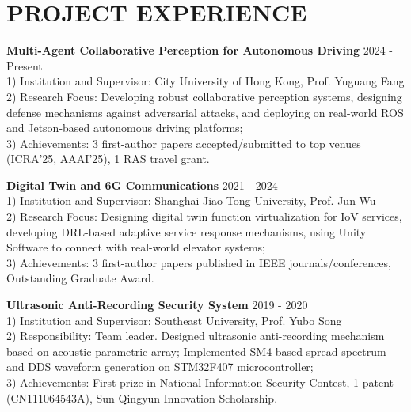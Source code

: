 \documentclass[letterpaper,11pt]{article}
\begin{document}
{{{{{{%
\section{\textbf{PROJECT EXPERIENCE}}
\vspace{2mm}

\begin{justify}
\normalsize
\textbf{Multi-Agent Collaborative Perception for Autonomous Driving}\cftdotfill{\cftdotsep} 2024 - Present\\
1) Institution and Supervisor: City University of Hong Kong, Prof. Yuguang Fang\\
\vspace{0.5mm}
2) Research Focus: Developing robust collaborative perception systems, designing defense mechanisms against adversarial attacks, and deploying on real-world ROS and Jetson-based autonomous driving platforms;\\
\vspace{0.5mm}
3) Achievements: 3 first-author papers accepted/submitted to top venues (ICRA'25, AAAI'25), 1 RAS travel grant.
\vspace{3.5mm}

\textbf{Digital Twin and 6G Communications}\cftdotfill{\cftdotsep} 2021 - 2024\\
1) Institution and Supervisor: Shanghai Jiao Tong University, Prof. Jun Wu\\
\vspace{0.5mm}
2) Research Focus: Designing digital twin function virtualization for IoV services, developing DRL-based adaptive service response mechanisms, using Unity Software to connect with real-world elevator systems;\\
\vspace{0.5mm}
3) Achievements: 3 first-author papers published in IEEE journals/conferences, Outstanding Graduate Award.
\vspace{3.5mm}

\textbf{Ultrasonic Anti-Recording Security System}\cftdotfill{\cftdotsep} 2019 - 2020\\
1) Institution and Supervisor: Southeast University, Prof. Yubo Song\\
\vspace{0.5mm}
2) Responsibility: Team leader. Designed ultrasonic anti-recording mechanism based on acoustic parametric array; Implemented SM4-based spread spectrum and DDS waveform generation on STM32F407 microcontroller;\\
\vspace{0.5mm}
3) Achievements: First prize in National Information Security Contest, 1 patent (CN111064543A), Sun Qingyun Innovation Scholarship.
\end{justify}

}}}}}}
\end{document}
